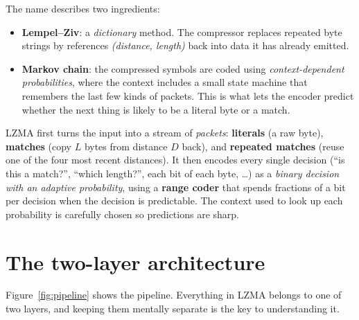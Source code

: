 \documentclass[11pt,a4paper,oneside]{book}
\begin{document}
The name describes two ingredients:

\begin{itemize}
\item \textbf{Lempel--Ziv}: a \emph{dictionary} method. The compressor replaces repeated byte strings by references
  \emph{(distance, length)} back into data it has already emitted.
\item \textbf{Markov chain}: the compressed symbols are coded using \emph{context-dependent probabilities}, where the
  context includes a small state machine that remembers the last few kinds of packets. This is what lets the
  encoder predict whether the next thing is likely to be a literal byte or a match.
\end{itemize}

\begin{keyidea}
LZMA first turns the input into a stream of \emph{packets}: \textbf{literals} (a raw byte), \textbf{matches}
(copy $L$ bytes from distance $D$ back), and \textbf{repeated matches} (reuse one of the four most recent
distances). It then encodes every single decision (``is this a match?'', ``which length?'', each bit of each byte,
\dots) as a \emph{binary decision with an adaptive probability}, using a \textbf{range coder} that spends
fractions of a bit per decision when the decision is predictable. The context used to look up each probability
is carefully chosen so predictions are sharp.
\end{keyidea}

\section{The two-layer architecture}

Figure~\ref{fig:pipeline} shows the pipeline. Everything in LZMA belongs to one of two layers, and keeping them
mentally separate is the key to understanding it.
\end{document}
